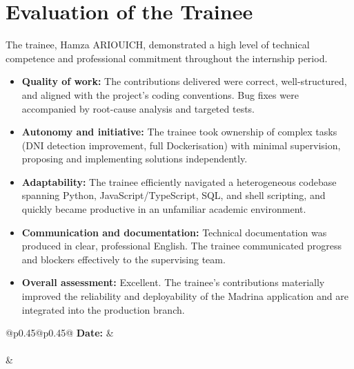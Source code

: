 \documentclass[a4paper,11pt]{article}
\begin{document}
\section{Evaluation of the Trainee}

The trainee, Hamza ARIOUICH, demonstrated a high level of technical competence and professional
commitment throughout the internship period.

\begin{itemize}[leftmargin=1.5em, itemsep=4pt]
  \item \textbf{Quality of work:} The contributions delivered were correct, well-structured, and
        aligned with the project's coding conventions. Bug fixes were accompanied by root-cause
        analysis and targeted tests.
  \item \textbf{Autonomy and initiative:} The trainee took ownership of complex tasks (DNI
        detection improvement, full Dockerisation) with minimal supervision, proposing and
        implementing solutions independently.
  \item \textbf{Adaptability:} The trainee efficiently navigated a heterogeneous codebase
        spanning Python, JavaScript/TypeScript, SQL, and shell scripting, and quickly became
        productive in an unfamiliar academic environment.
  \item \textbf{Communication and documentation:} Technical documentation was produced in clear,
        professional English. The trainee communicated progress and blockers effectively to the
        supervising team.
  \item \textbf{Overall assessment:} Excellent. The trainee's contributions materially improved
        the reliability and deployability of the Madrina application and are integrated into the
        production branch.
\end{itemize}

\vspace{20pt}

\noindent
\begin{tabular}{@{}p{0.45\linewidth}@{\hspace{0.08\linewidth}}p{0.45\linewidth}@{}}
  \textbf{Date:} \dotfill &  \\[30pt]
   \\[40pt]
  \dotfill & \\
\end{tabular}
\end{document}
